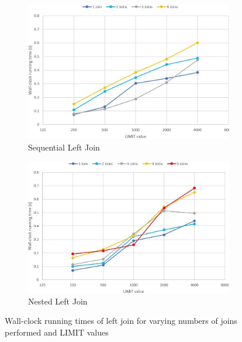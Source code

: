 \documentclass[10pt,a4paper]{article}
\begin{document}
	\begin{figure}[h!]
		\centering
		\begin{subfigure}[b]{0.45\textwidth}
			\hspace{-1cm}
			\centering
			\includegraphics[width=1.1\textwidth]{figures/graph_sequential_left_join}
			\caption{Sequential Left Join}
			\label{fig:seq_left_join}
		\end{subfigure}
		\begin{subfigure}[b]{0.45\textwidth}
			\hspace{1cm}
			\centering
			\includegraphics[width=1.1\textwidth]{figures/graph_nested_left_join}
			\caption{Nested Left Join}
			\label{fig:nested_left_join}
		\end{subfigure}
		\caption{Wall-clock running times of left join for varying numbers of joins performed and LIMIT values}
		\label{fig:left_join}
	\end{figure}
\end{document}

